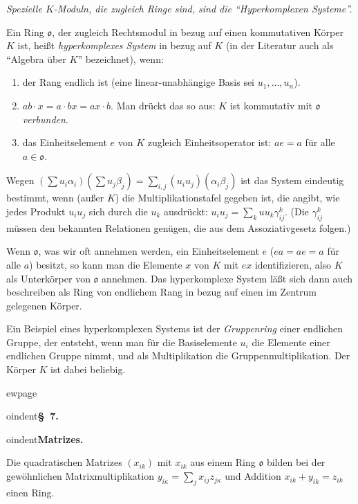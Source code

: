 \documentclass[12pt,a4paper]{article}
\theoremstyle{definition}
\begin{document}
\textit{Spezielle $K$-Moduln, die zugleich Ringe sind, sind die
``Hyperkomplexen Systeme''.}

Ein Ring $\mathfrak{o}$, der zugleich Rechtsmodul in bezug auf einen
kommutativen K\"orper $K$ ist, hei\ss t \textit{hyperkomplexes System} in
bezug auf $K$ (in der Literatur auch als ``Algebra \"uber $K$''
bezeichnet), wenn:
\begin{enumerate}[label=\arabic*.]
  \item der Rang endlich ist (eine linear-unabh\"angige Basis sei
    $u_1, \dots, u_n$).
  \item $ab \cdot x = a \cdot bx = ax \cdot b$. Man dr\"uckt das so
    aus: $K$ ist kommutativ mit $\mathfrak{o}$ \textit{verbunden}.
  \item das Einheitselement $e$ von $K$ zugleich Einheitsoperator ist:
    $ae = a$ f\"ur alle $a \in \mathfrak{o}$.
\end{enumerate}

Wegen $(\sum u_i \alpha_i)(\sum u_j \beta_j) = \sum\limits_{i,j}(u_i u_j)
(\alpha_i \beta_j)$ ist das System eindeutig bestimmt, wenn (au\ss er $K$)
die Multiplikationstafel gegeben ist, die angibt, wie jedes Produkt
$u_i u_j$ sich durch die $u_k$ ausdr\"uckt: $u_i u_j = \sum\limits_k
u u_k \gamma_{ij}^k$. (Die $\gamma_{ij}^k$ m\"ussen den bekannten
Relationen gen\"ugen, die aus dem Assoziativgesetz folgen.)

Wenn $\mathfrak{o}$, was wir oft annehmen werden, ein Einheitselement $e$
($ea = ae = a$ f\"ur alle $a$) besitzt, so kann man die Elemente $x$ von
$K$ mit $ex$ identifizieren, also $K$ als Unterk\"orper von
$\mathfrak{o}$ annehmen. Das hyperkomplexe System l\"a\ss t sich dann
auch beschreiben als Ring von endlichem Rang in bezug auf einen im
Zentrum gelegenen K\"orper.

Ein Beispiel eines hyperkomplexen Systems ist der \textit{Gruppenring}
einer endlichen Gruppe, der entsteht, wenn man f\"ur die Basiselemente
$u_i$ die Elemente einer endlichen Gruppe nimmt, und als
Multiplikation die Gruppenmultiplikation. Der K\"orper $K$ ist dabei
beliebig.



ewpage
\setcounter{page}{592}



oindent\textbf{\S~7.}



oindent\textbf{Matrizes.}

Die quadratischen Matrizes $(x_{ik})$ mit $x_{ik}$ aus einem Ring
$\mathfrak{o}$ bilden bei der gew\"ohnlichen Matrixmultiplikation
$y_{i\kappa} = \sum\limits_j x_{ij} z_{j\kappa}$ und Addition
$x_{ik} + y_{ik} = z_{ik}$ einen Ring.
\end{document}
